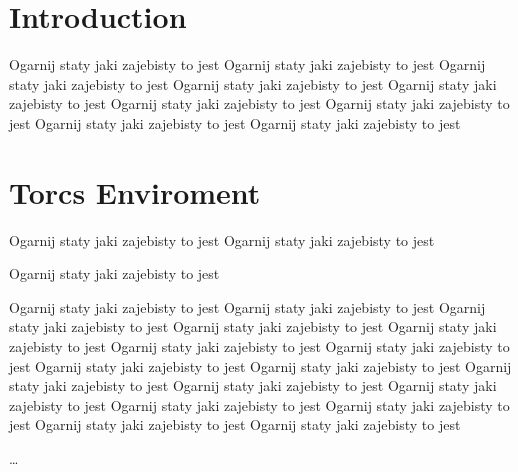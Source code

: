 \documentclass[declaration,shortabstract,english,inz]{iithesis}
\author         {Maksymilian Debeściak}
\begin{document}

\chapter{Introduction}
Ogarnij staty jaki zajebisty to jest
Ogarnij staty jaki zajebisty to jest
Ogarnij staty jaki zajebisty to jest
Ogarnij staty jaki zajebisty to jest
Ogarnij staty jaki zajebisty to jest
Ogarnij staty jaki zajebisty to jest
Ogarnij staty jaki zajebisty to jest
Ogarnij staty jaki zajebisty to jest
Ogarnij staty jaki zajebisty to jest

\chapter{Torcs Enviroment}

Ogarnij staty jaki zajebisty to jest
Ogarnij staty jaki zajebisty to jest

Ogarnij staty jaki zajebisty to jest

Ogarnij staty jaki zajebisty to jest
Ogarnij staty jaki zajebisty to jest
Ogarnij staty jaki zajebisty to jest
Ogarnij staty jaki zajebisty to jest
Ogarnij staty jaki zajebisty to jest
Ogarnij staty jaki zajebisty to jest
Ogarnij staty jaki zajebisty to jest
Ogarnij staty jaki zajebisty to jest
Ogarnij staty jaki zajebisty to jest
Ogarnij staty jaki zajebisty to jest
Ogarnij staty jaki zajebisty to jest
Ogarnij staty jaki zajebisty to jest
Ogarnij staty jaki zajebisty to jest
Ogarnij staty jaki zajebisty to jest
Ogarnij staty jaki zajebisty to jest
Ogarnij staty jaki zajebisty to jest

\ldots


\end{document}
